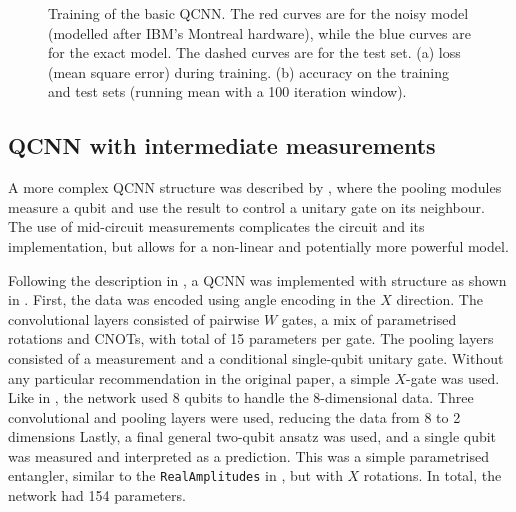 \begin{figure}
\begin{subfigure}{0.49\textwidth}
        \caption{}
        \label{fig:qcnn_acc}
    \end{subfigure}
    \caption{
        Training of the basic QCNN.
        The red curves are for the noisy model (modelled after IBM's Montreal hardware), while the blue curves are for the exact model.
        The dashed curves are for the test set.
        (a) loss (mean square error) during training.
        (b) accuracy on the training and test sets (running mean with a 100 iteration window).
    }
    \label{fig:qcnn_training}
\end{figure}


\subsection{QCNN with intermediate measurements}
A more complex QCNN structure was described by \textcite{pesah2021}, where the pooling modules measure a qubit and use the result to control a unitary gate on its neighbour.
The use of mid-circuit measurements complicates the circuit and its implementation, but allows for a non-linear and potentially more powerful model.

Following the description in \cite{pesah2021}, a QCNN was implemented with structure as shown in .
First, the data was encoded using angle encoding in the $X$ direction.
The convolutional layers consisted of pairwise $W$ gates, a mix of parametrised rotations and CNOTs, with total of 15 parameters per gate.
The pooling layers consisted of a measurement and a conditional single-qubit unitary gate.
Without any particular recommendation in the original paper, a simple $X$-gate was used.
Like in , the network used 8 qubits to handle the 8-dimensional data.
Three convolutional and pooling layers were used, reducing the data from 8 to 2 dimensions
Lastly, a final general two-qubit ansatz was used, and a single qubit was measured and interpreted as a prediction.
This was a simple parametrised entangler, similar to the \texttt{RealAmplitudes} in , but with $X$ rotations.
In total, the network had 154 parameters.

